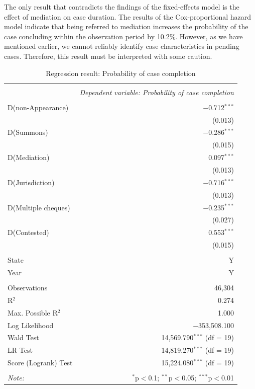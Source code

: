 \documentclass[12pt,a4paper]{article}
\begin{document}
\begin{appendices}
The only result that contradicts the findings of the fixed-effects model is the effect of mediation on case duration. The results of the Cox-proportional hazard model indicate that being referred to mediation increases the probability of the case concluding within the observation period by 10.2\%. However, as we have mentioned earlier, we cannot reliably identify case characteristics in pending cases. Therefore, this result must be interpreted with some caution.

\newpage
{\footnotesize
\begin{longtable}[ht]{lr}
\caption{Regression result: Probability of case completion}\label{tab:survialProb}\\
\\[-1.8ex]
\hline \\[-1.8ex]
& \multicolumn{1}{c}{\textit{Dependent variable: Probability of case completion}} \\
\cline{2-2}
\hline \\[-1.8ex]

D(non-Appearance) & $-$0.712$^{***}$ \\
& (0.013) \\
D(Summons) & $-$0.286$^{***}$ \\
& (0.015) \\
D(Mediation) & 0.097$^{***}$ \\
& (0.013) \\
D(Jurisdiction) & $-$0.716$^{***}$ \\
& (0.013) \\
D(Multiple cheques) & $-$0.235$^{***}$ \\
& (0.027) \\
D(Contested) & 0.553$^{***}$ \\
& (0.015) \\
\hline \\[-1.8ex]
State & Y \\
Year & Y \\
\hline \\[-1.8ex]
Observations & 46,304 \\
R$^{2}$ & 0.274 \\
Max. Possible R$^{2}$ & 1.000 \\
Log Likelihood & $-$353,508.100 \\
Wald Test & 14,569.790$^{***}$ (df = 19) \\
LR Test & 14,819.270$^{***}$ (df = 19) \\
Score (Logrank) Test & 15,224.080$^{***}$ (df = 19) \\
\hline
\hline \\[-1.8ex]
\textit{Note:} & \multicolumn{1}{r}{$^{*}$p$<$0.1; $^{**}$p$<$0.05; $^{***}$p$<$0.01} \\
\end{longtable}}


\end{appendices}
\end{document}
